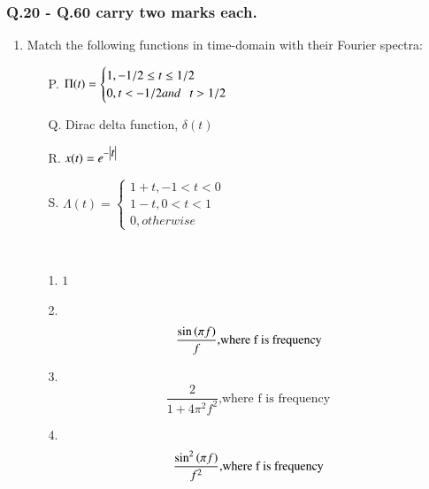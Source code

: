 \documentclass[journal,12pt,onecolumn,fleqn]{IEEEtran}
\theoremstyle{remark}
\theoremstyle{remark}
\begin{document}
\subsubsection*{Q.20 - Q.60 carry two marks each.}
\begin{enumerate}[label=Q.\arabic*.,font=\bfseries, start = 21]
\item Match the following functions in time-domain with their Fourier spectra: \hfill{} 
\begin{multicols}{2}
    \begin{itemize}
    \item [P.]  $\Pi{(t)} =
        \begin{cases}
        1,-1/2\leq t \leq 1/2\\
        0,t<-1/2and\hspace{.25cm}t>1/2
        \end{cases}  $    
    \item [Q.] Dirac delta function, $\delta(t)$
    \item [R.] $x(t) = e^{-\begin{vmatrix}t\end{vmatrix}}$
    \item [S.] $\Lambda{(t)} =
        \begin{cases}
        1+t,-1<t<0\\
        1-t,0<t<1\\
        0,otherwise
    \end{cases}  $
\end{itemize}
            

            \columnbreak
            
            \\ \begin{itemize}           
            \item [1.] $1$ 
            \item [2.] \[ \frac{\sin{\ensuremath{\left(\pi f\right)}}}{f} \text{,where f is frequency }\]
            \item [3.] $$ \frac{2}{1+4\pi^2f^2}\text{,where f is frequency }$$
            \item [4.] $$ \frac{\sin^2\left(\pi f\right)}{f^2}\text{,where f is frequency }$$
            \end{itemize}
           

\end{multicols}
\end{enumerate}
\end{document}
